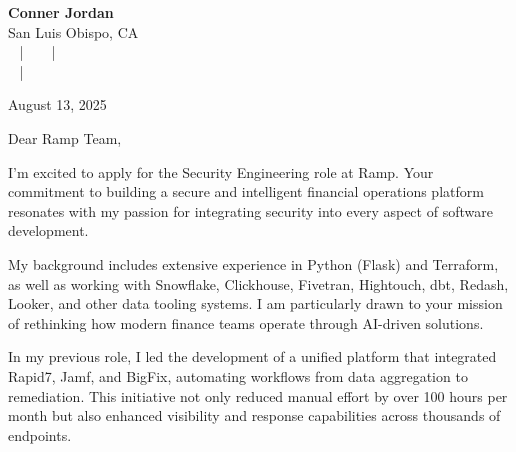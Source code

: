 \documentclass[letterpaper,11pt]{article}
\begin{document}
\begin{center}
  {\Huge \textbf{Conner Jordan}}\\[4pt]
  {\Large San Luis Obispo, CA}\\[4pt]
  \href{tel:+18059759793}{
    } ~ | ~
  \href{mailto:connercharlesjordan@gmail.com}{
    } ~ | ~
   \\
  \href{https://www.linkedin.com/in/conner-jordan-4b268514a/}{
    } ~ | ~
  \href{https://github.com/cjordan223}{
    }
\end{center}



\vspace{16pt}

\begin{flushright}
August 13, 2025
\end{flushright}



Dear Ramp Team,

\vspace{16pt}

I'm excited to apply for the Security Engineering role at Ramp. Your commitment to building a secure and intelligent financial operations platform resonates with my passion for integrating security into every aspect of software development.

My background includes extensive experience in Python (Flask) and Terraform, as well as working with Snowflake, Clickhouse, Fivetran, Hightouch, dbt, Redash, Looker, and other data tooling systems. I am particularly drawn to your mission of rethinking how modern finance teams operate through AI-driven solutions.

\vspace{16pt}

In my previous role, I led the development of a unified platform that integrated Rapid7, Jamf, and BigFix, automating workflows from data aggregation to remediation. This initiative not only reduced manual effort by over 100 hours per month but also enhanced visibility and response capabilities across thousands of endpoints.
\end{document}
